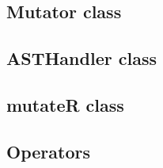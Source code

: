 

\begin{chapterabstract}
\end{chapterabstract}

\subsection{Mutator class}


\subsection{ASTHandler class}


\subsection{mutateR class}


\subsection{Operators}